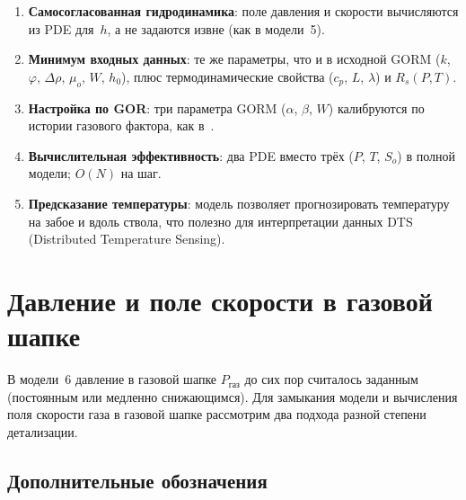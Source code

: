 \documentclass[12pt,a4paper]{article}
\begin{document}
\begin{enumerate}[nosep]
  \item \textbf{Самосогласованная гидродинамика}: поле давления и
        скорости вычисляются из PDE для~$h$, а не задаются извне
        (как в модели~5).
  \item \textbf{Минимум входных данных}: те же параметры, что и в
        исходной GORM ($k$, $\varphi$, $\Delta\rho$, $\mu_o$, $W$,
        $h_0$), плюс термодинамические свойства
        ($c_p$, $L$, $\lambda$) и $R_s(P,T)$.
  \item \textbf{Настройка по GOR}: три параметра GORM ($\alpha$,
        $\beta$, $W$) калибруются по истории газового фактора,
        как в~\cite{mjaavatten2006}.
  \item \textbf{Вычислительная эффективность}: два PDE вместо
        трёх ($P$, $T$, $S_o$) в полной модели; $O(N)$ на шаг.
  \item \textbf{Предсказание температуры}: модель позволяет
        прогнозировать температуру на забое и вдоль ствола, что
        полезно для интерпретации данных DTS (Distributed
        Temperature Sensing).
\end{enumerate}

\section{Давление и поле скорости в газовой шапке}

В модели~6 давление в газовой шапке $P_{\text{газ}}$ до сих пор
считалось заданным (постоянным или медленно снижающимся).
Для замыкания модели и вычисления поля скорости газа в газовой шапке
рассмотрим два подхода разной степени детализации.

\subsection{Дополнительные обозначения}
\end{document}
